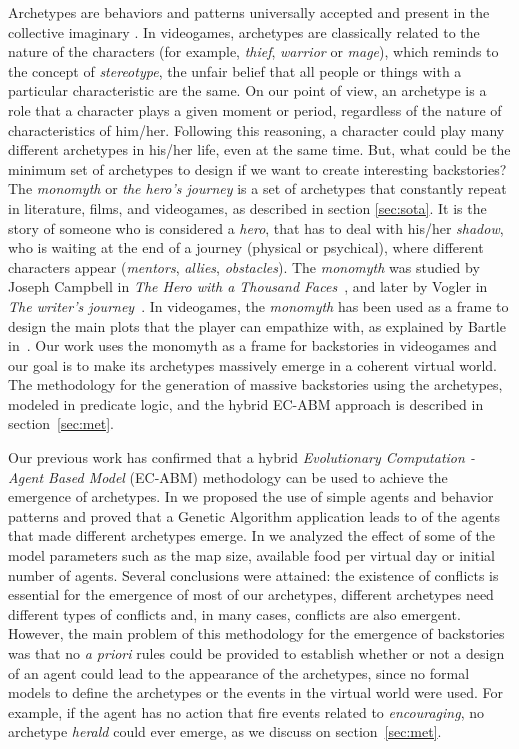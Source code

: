 \documentclass[conference]{IEEEtran}
\begin{document}
Archetypes are behaviors and patterns universally accepted and present in the
collective imaginary \cite{garry2005archetypes}. In videogames, archetypes are classically related to the nature of the characters (for example, \textit{thief}, \textit{warrior} or \textit{mage}), which reminds to the concept of \textit{stereotype}, the unfair belief that all people or things with a particular characteristic are the same. On our point of view, an archetype is a role that a character plays a given moment or period, regardless of the nature of characteristics of him/her. Following this reasoning, a character could play many different archetypes in his/her life, even at the same time. But, what could be the minimum set of archetypes to design if we want to create interesting backstories? The \textit{monomyth} or \textit{the hero's journey} is a set of archetypes that constantly repeat in literature, films, and videogames, as described in section \ref{sec:sota}. It is the story of someone who is considered a \textit{hero}, that has to deal with his/her \textit{shadow}, who is waiting at the end of a journey (physical or psychical), where different characters appear (\textit{mentors}, \textit{allies}, \textit{obstacles}). The \textit{monomyth} was studied by Joseph Campbell in \textit{The Hero with a Thousand Faces}~\cite{joseph1949hero}, and later by Vogler in \textit{The writer's journey}~\cite{vogler2007writer}. In videogames, the \textit{monomyth} has been used as a frame to design the main plots that the player can empathize with, as explained by Bartle in~\cite{bartle2004multihero}. Our work uses the monomyth as a frame for backstories in videogames and our goal is to make its archetypes massively emerge in a coherent virtual world. The methodology for the generation of massive backstories using the archetypes, modeled in predicate logic, and the hybrid EC-ABM approach is described in section~\ref{sec:met}. 

Our previous work has confirmed that a hybrid \textit{Evolutionary
  Computation - Agent Based Model} (EC-ABM) methodology can be used to
achieve the emergence of archetypes. In \cite{garcia14my} we proposed
the use of simple agents and behavior patterns and proved that a
Genetic Algorithm application leads to of the agents that
made different archetypes emerge. In \cite{garcia2015world} we
analyzed the effect of some of the model parameters such as
the map size, available food per virtual day or initial number of
agents.
Several conclusions were attained: the existence of conflicts is essential for the emergence of most of our archetypes, different archetypes need different types of conflicts and, in many cases, conflicts are also emergent.
However, the main problem of this methodology for the emergence of
backstories was that no {\em a priori} rules
could be provided to establish whether or not a design of an agent
could lead to the appearance of the archetypes, since no formal models to define the archetypes or the events in the virtual world were used. For example, if the agent has no action that fire events related to \textit{encouraging}, no archetype \textit{herald} could ever emerge, as we discuss on section~\ref{sec:met}.
\end{document}
